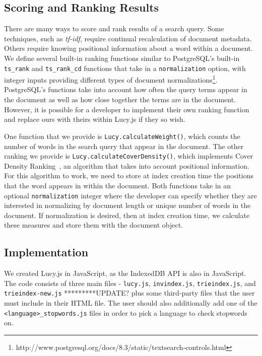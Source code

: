 \documentclass{vldb}
\begin{document}
\subsection{Scoring and Ranking Results}

There are many ways to score and rank results of a search query. Some techniques, such as \textit{tf-idf}, require continual recalculation of document metadata. Others require knowing positional information about a word within a document. We define several built-in ranking functions similar to PostgreSQL's built-in \texttt{ts\_rank} and \texttt{ts\_rank\_cd} functions that take in a \texttt{normalization} option, with integer inputs providing different types of document normalizations\footnote{http://www.postgresql.org/docs/8.3/static/textsearch-controls.html}.
PostgreSQL's functions take into account how often the query terms appear in the document as well as how close together the terms are in the document. However, it is possible for a developer to implement their own ranking function and replace ours with theirs within Lucy.js if they so wish.

One function that we provide is \texttt{Lucy.calculateWeight()}, which counts the number of words in the search query that appear in the document. The other ranking we provide is \texttt{Lucy.calculateCoverDensity()}, which implements Cover Density Ranking~\cite{li2002improvement}, an algorithm that takes into account positional information. For this algorithm to work, we need to store at index creation time the positions that the word appears in within the document. Both functions take in an optional \texttt{normalization} integer where the developer can specify whether they are interested in normalizing by document length or unique number of words in the document. If normalization is desired, then at index creation time, we calculate these measures and store them with the document object.

\subsection{Implementation}

We created Lucy.js in JavaScript, as the IndexedDB API is also in JavaScript. The code consists of three main files - \texttt{lucy.js}, \texttt{invindex.js}, \texttt{trieindex.js},  and \texttt{trieindex-new.js} *********UPDATE? plus some third-party files that the user must include in their HTML file. The user should also additionally add one of the \texttt{<language>\_stopwords.js} files in order to pick a language to check stopwords on.
\end{document}
